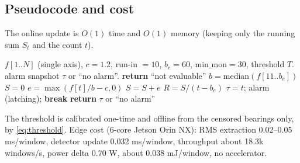 \documentclass[journal]{IEEEtran}
\begin{document}
\subsection{Pseudocode and cost}
The online update is $O(1)$ time and $O(1)$ memory (keeping only the running sum $S_t$ and the count $t$).
\begin{algorithm}[!t]
\caption{Rate-normalized online early-warning detector (single axis).}
\label{alg:detector}
\begin{algorithmic}[1]
\REQUIRE $f[1..N]$ (single axis), $c=1.2$, run-in $=10$, $b_e=60$, $\mathrm{min\_mon}=30$, threshold $T$.
\ENSURE alarm snapshot $\tau$ or ``no alarm''.
 \STATE \textbf{return} ``not evaluable'' 
\ENDIF
\STATE $b=\mathrm{median}(f[11..b_e])$ 
\STATE $S=0$
 
\STATE $e=\max(f[t]/b-c,0)$
\STATE $S=S+e$
\STATE $R=S/(t-b_e)$ 
\STATE $\tau=t$; alarm (latching); \textbf{break}
\ENDIF
\ENDFOR
\STATE \textbf{return} $\tau$ or ``no alarm''
\end{algorithmic}
\end{algorithm}
The threshold is calibrated one-time and offline from the censored bearings only, by \eqref{eq:threshold}. Edge cost (6-core Jetson Orin NX): RMS extraction 0.02--0.05 ms/window, detector update 0.032 ms/window, throughput about 18.3k windows/s, power delta 0.70 W, about 0.038 mJ/window, no accelerator.
\end{document}
